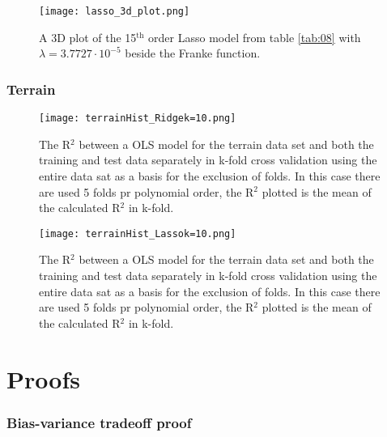 \documentclass[uio,jmp,amsmath,amssymb,reprint,nofootinbib]{revtex4-1}
\numberwithin{equation}{section}
\begin{document}
\begin{figure}[H]
    \centering
    \texttt{[image: lasso\_3d\_plot.png]}
    \caption{A 3D plot of the 15\(^\text{th}\) order Lasso model from table \ref{tab:08} with \(\lambda = 3.7727\cdot 10^{-5}\) beside the Franke function.}
    \label{fig:ridge_3d}
\end{figure}

\subsubsection{Terrain}

\begin{figure}[H]
    \centering
    \texttt{[image: terrainHist\_Ridgek=10.png]}
    \caption{The R\(^2\) between a OLS model for the terrain data set and both the training and test data separately in k-fold cross validation using the entire data sat as a basis for the exclusion of folds. In this case there are used 5 folds pr polynomial order, the R\(^2\) plotted is the mean of the calculated R\(^2\) in k-fold.}
    \label{fig:hist_terrain_ridge}
\end{figure}

\begin{figure}[H]
    \centering
    \texttt{[image: terrainHist\_Lassok=10.png]}
    \caption{The R\(^2\) between a OLS model for the terrain data set and both the training and test data separately in k-fold cross validation using the entire data sat as a basis for the exclusion of folds. In this case there are used 5 folds pr polynomial order, the R\(^2\) plotted is the mean of the calculated R\(^2\) in k-fold.}
    \label{fig:hist_terrain_lasso}
\end{figure}

\section{Proofs}\label{sec:proof}

\subsubsection{Bias-variance tradeoff proof}

\onecolumngrid
\end{document}
